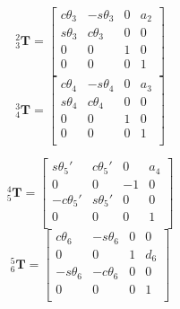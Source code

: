 \begin{multicols}{2}
    \noindent
    \begin{equation}
        ^2_3\textbf{T} = \begin{bmatrix}
                    c\theta_3 & -s\theta_3 & 0 & a_2 \\
                    s\theta_3 & c\theta_3 & 0 & 0 \\
                    0 & 0 & 1 & 0 \\
                    0 & 0 & 0 & 1 \\
                \end{bmatrix}
    \end{equation}
    \begin{equation}
        ^3_4\textbf{T} = \begin{bmatrix}
                    c\theta_4 & -s\theta_4 & 0 & a_3 \\
                    s\theta_4 & c\theta_4 & 0 & 0 \\
                    0 & 0 & 1 & 0 \\
                    0 & 0 & 0 & 1 \\
                \end{bmatrix}
    \end{equation}
\end{multicols}

\begin{multicols}{2}
    \noindent
    \begin{equation}
        \label{eq:t45}
        ^4_5\textbf{T} = \begin{bmatrix}
                    s\theta_5' & c\theta_5' & 0 & a_4 \\
                    0 & 0 & -1 & 0 \\
                    -c\theta_5' & s\theta_5' & 0 & 0 \\
                    0 & 0 & 0 & 1 \\        
                \end{bmatrix}
    \end{equation}
    \begin{equation}
        \label{eq:t56}
        ^5_6\textbf{T} = \begin{bmatrix}
                    c\theta_6 & -s\theta_6 & 0 & 0 \\
                    0 & 0 & 1 & d_6 \\
                    -s\theta_6 & -c\theta_6 & 0 & 0 \\
                    0 & 0 & 0 & 1 \\
                \end{bmatrix}
    \end{equation}
\end{multicols}

